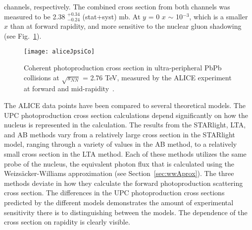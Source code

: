     channels, respectively. 
  The combined cross section from both channels was measured to be 
    2.38 $_{-0.24}^{+0.34}$ (stat+syst) mb. 
  At $y$ = 0 $x$ $\sim$ 10$^{-3}$, which is a smaller $x$ than at forward 
    rapidity, and more sensitive to the nuclear gluon shadowing 
    (see Fig.~\ref{fig:aliceMoney}).
    \begin{figure}[!Hhbt]
      \centering
      \texttt{[image: aliceJpsiCo]}
      \caption{Coherent \JPsi{} photoproduction cross section in ultra-peripheral
        PbPb collisions at $\sqrt{s_{NN}}$ = 2.76 TeV, measured by the ALICE 
        experiment at forward and mid-rapidity~\cite{Abelev:2012ba,Abbas:2013oua}.}   
      \label{fig:aliceMoney}
    \end{figure}

    The ALICE data points have been compared to several theoretical models. 
  The UPC photoproduction cross section calculations depend significantly on 
    how the nucleus is represented in the calculation. 
  The results from the STARlight, LTA, and AB methods vary from a relatively 
    large cross section in the STARlight model, ranging through a variety of values
    in the AB method, to a relatively small cross section in the LTA method. 
  Each of these methods utilizes the same probe of the nucleus, the equivalent 
    photon flux that is calculated using the Weizs\"{a}cker-Williams approximation 
    (see Section~\ref{sec:wwAprox}). 
  The three methods deviate in how they calculate the forward photoproduction
    scattering cross section.
  The differences in the UPC photoproduction cross sections predicted by the 
    different models demonstrates the amount of experimental sensitivity there 
    is to distinguishing between the models. 
  The dependence of the cross section on rapidity is clearly visible.   

